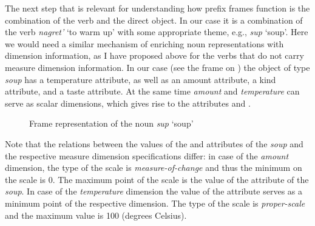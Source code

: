 The next step that is relevant for understanding how prefix frames function is the combination of the verb and the direct object. In our case it is a combination of the verb \textit{nagret'} `to warm up' with some appropriate theme, e.g., \textit{sup} `soup'. Here we would need a similar mechanism of enriching noun representations with dimension information, as I have proposed above for the verbs that do not carry measure dimension information. In our case (see the frame on ) the object of type \textit{soup} has a temperature attribute, as well as an amount attribute, a kind attribute, and a taste attribute. At the same time \textit{amount} and \textit{temperature} can serve as scalar dimensions, which gives rise to the attributes \AMOUNTDIM and \TEMPDIM.  

\begin{figure}
\centering
{}
\caption{Frame representation of the noun \textit{sup} `soup' \label{frame:soup:dic}}
\end{figure}

Note that the relations between the values of the \AMOUNT and \TEMP attributes of the \textit{soup} and the respective measure dimension specifications differ:  in case of the \textit{amount} dimension, the type of the scale is \textit{measure-of-change} and thus the minimum on the scale is 0. The maximum point of the scale is the value of the \AMOUNT attribute of the \textit{soup}. In case of the \textit{temperature} dimension the value of the \TEMP attribute serves as a minimum point of the respective dimension. The type of the scale is \textit{proper-scale} and the maximum value is 100 (degrees Celsius).

